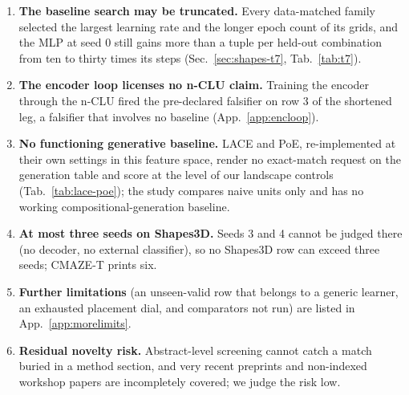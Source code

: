 \documentclass{article} %
\newcommand{\Kstar}{\ensuremath{K^{\star}}}
\begin{document}
\begin{enumerate}
  four-part total is U-shaped in $K$, with its minimum at $K=24$ (Tab.~\ref{tab:kcurve}).
  $\Kstar$ is not the point of smallest footprint. On the one configuration at $K\ge36$ whose composition
  was measured, composition collapses (Tab.~\ref{tab:kcurve}, caption).
  No object with a float64 sufficient statistic composes and forgets inside the reference at rank
  64 on any swept partition (the validation sweep labels itself a smoke).
\item \textbf{The baseline search may be truncated.} Every data-matched family selected the largest
  learning rate and the longer epoch count of its grids, and the MLP at seed 0 still gains more than a tuple %
  per held-out combination from ten to thirty times its steps (Sec.~\ref{sec:shapes-t7}, Tab.~\ref{tab:t7}).
\item \textbf{The encoder loop licenses no n-CLU claim.} Training the encoder through the n-CLU
  fired the pre-declared falsifier on row 3 of the shortened leg, a falsifier that involves no baseline %
  (App.~\ref{app:encloop}).
\item \textbf{No functioning generative baseline.} LACE and PoE, re-implemented at their own settings
  in this feature space, render no exact-match request on the generation table and score at the level
  of our landscape controls (Tab.~\ref{tab:lace-poe}); the study compares naive units only and has no
  working compositional-generation baseline.
\item \textbf{At most three seeds on Shapes3D.} Seeds 3 and 4 cannot be judged there (no decoder, no
  external classifier), so no Shapes3D row can exceed three seeds; CMAZE-T prints six.
\item \textbf{Further limitations} (an unseen-valid row that belongs to a generic learner, an
  exhausted placement dial, and comparators not run) are listed in App.~\ref{app:morelimits}.
\item \textbf{Residual novelty risk.} Abstract-level screening cannot catch a match buried in a
  method section, and very recent preprints and non-indexed workshop papers are incompletely
  covered; we judge the risk low. %
\end{enumerate}
\end{document}
